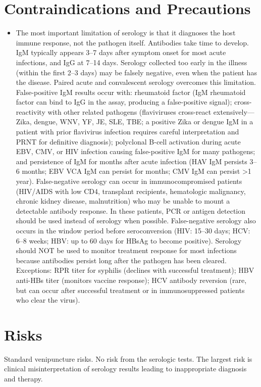 \section*{Contraindications and Precautions}
\begin{itemize}
  \item The most important limitation of serology is that it diagnoses the host immune response, not the pathogen itself. Antibodies take time to develop. IgM typically appears 3--7 days after symptom onset for most acute infections, and IgG at 7--14 days. Serology collected too early in the illness (within the first 2--3 days) may be falsely negative, even when the patient has the disease. Paired acute and convalescent serology overcomes this limitation. False-positive IgM results occur with: rheumatoid factor (IgM rheumatoid factor can bind to IgG in the assay, producing a false-positive signal); cross-reactivity with other related pathogens (flaviviruses cross-react extensively---Zika, dengue, WNV, YF, JE, SLE, TBE; a positive Zika or dengue IgM in a patient with prior flavivirus infection requires careful interpretation and PRNT for definitive diagnosis); polyclonal B-cell activation during acute EBV, CMV, or HIV infection causing false-positive IgM for many pathogens; and persistence of IgM for months after acute infection (HAV IgM persists 3--6 months; EBV VCA IgM can persist for months; CMV IgM can persist >1 year). False-negative serology can occur in immunocompromised patients (HIV/AIDS with low CD4, transplant recipients, hematologic malignancy, chronic kidney disease, malnutrition) who may be unable to mount a detectable antibody response. In these patients, PCR or antigen detection should be used instead of serology when possible. False-negative serology also occurs in the window period before seroconversion (HIV: 15--30 days; HCV: 6--8 weeks; HBV: up to 60 days for HBsAg to become positive). Serology should NOT be used to monitor treatment response for most infections because antibodies persist long after the pathogen has been cleared. Exceptions: RPR titer for syphilis (declines with successful treatment); HBV anti-HBs titer (monitors vaccine response); HCV antibody reversion (rare, but can occur after successful treatment or in immunosuppressed patients who clear the virus).
\end{itemize}
\section*{Risks}
Standard venipuncture risks. No risk from the serologic tests. The largest risk is clinical misinterpretation of serology results leading to inappropriate diagnosis and therapy.

